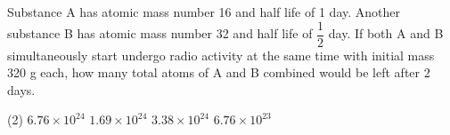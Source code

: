 \item Substance A has atomic mass number 16 and half life of 1 day. Another substance B has atomic mass number 32 and half life of 
$\dfrac{1}{2}$ day. If both A and B simultaneously start undergo radio activity at the same time with initial mass 320 g each, how many total atoms of A and B combined would be left after 2 days.
\begin{tasks}(2)
    \task \(6.76 \times 10^{24}\)
    \task \(1.69 \times 10^{24}\)
    \task \(3.38 \times 10^{24}\)
    \task \(6.76 \times 10^{23}\)
\end{tasks}